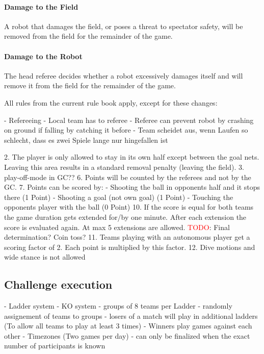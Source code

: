 \paragraph{Damage to the Field}
\label{sec:damage}

A robot that damages the field, or poses a threat to spectator safety, will be removed from the field for the remainder of the game.

\paragraph{Damage to the Robot}
\label{sec:damage}

The head referee decides whether a robot excessively damages itself and will remove it from the field for the remainder of the game.


\newpage
All rules from the current rule book apply, except for these changes:

- Refereeing
    - Local team has to referee
    - Referee can prevent robot by crashing on ground if falling by catching it before
    - Team scheidet aus, wenn Laufen so schlecht, dass es zwei Spiele lange nur hingefallen ist

2. The player is only allowed to stay in its own half except between the goal nets. Leaving this area results in a standard removal penalty (leaving the field).
3. play-off-mode in GC?? 
6. Points will be counted by the referees and not by the GC.
7. Points can be scored by:
    - Shooting the ball in opponents half and it stops there (1 Point)
    - Shooting a goal (not own goal) (1 Point)
    - Touching the opponents player with the ball (0 Point)
10. If the score is equal for both teams the game duration gets extended for/by one minute. After each extension the score is evaluated again. At max 5 extensions are allowed. \textcolor{red}{TODO}: Final determination? Coin toss?
11. Teams playing with an autonomous player get a scoring factor of 2. Each point is multiplied by this factor.
12. Dive motions and wide stance is not allowed

\subsection{Challenge execution}
- Ladder system
    - KO system 
    - groups of 8 teams per Ladder
    - randomly assignement of teams to groups
    - losers of a match will play in additional ladders (To allow all teams to play at least 3 times)
    - Winners play games against each other
    - Timezones (Two games per day)
    - can only be finalized when the exact number of participants is known